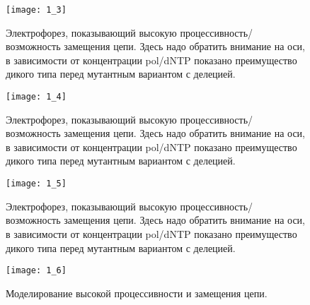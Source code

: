 \begin{figure}[H]
	\centering
	\texttt{[image: 1\_3]}
	\caption{Электрофорез, показывающий высокую процессивность/возможность замещения цепи. Здесь надо обратить внимание на оси, в зависимости от концентрации pol/dNTP показано преимущество дикого типа перед мутантным вариантом с делецией.}
	\label{fig:1_3}
\end{figure}

\begin{figure}[H]
	\centering
	\texttt{[image: 1\_4]}
	\caption{Электрофорез, показывающий высокую процессивность/возможность замещения цепи. Здесь надо обратить внимание на оси, в зависимости от концентрации pol/dNTP показано преимущество дикого типа перед мутантным вариантом с делецией.}
	\label{fig:1_4}
\end{figure}

\begin{figure}[H]
	\centering
	\texttt{[image: 1\_5]}
	\caption{Электрофорез, показывающий высокую процессивность/возможность замещения цепи. Здесь надо обратить внимание на оси, в зависимости от концентрации pol/dNTP показано преимущество дикого типа перед мутантным вариантом с делецией.}
	\label{fig:1_5}
\end{figure}

\begin{figure}[H]
	\centering
	\texttt{[image: 1\_6]}
	\caption{Моделирование высокой процессивности и замещения цепи.}
	\label{fig:1_6}
\end{figure}